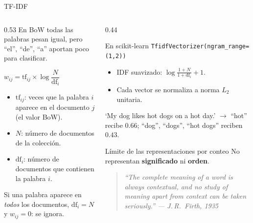 \documentclass[aspectratio=169, 10pt]{beamer}
\newcommand{\formula}[1]{%
	\begin{tcolorbox}[colback=UCMBlue!8, colframe=UCMBlue, arc=4pt,
		boxsep=2pt, left=6pt, right=6pt, top=3pt, bottom=3pt]
		#1
	\end{tcolorbox}
}
\begin{document}
\begin{frame}{TF-IDF}

	\begin{columns}[T]
		\begin{column}{0.53\textwidth}
			En BoW todas las palabras pesan igual, pero ``el'', ``de'', ``a'' aportan poco para clasificar.

			\formula{\centering $w_{ij} = \mathrm{tf}_{ij} \times \log\dfrac{N}{\mathrm{df}_i}$}

			\small
			\begin{itemize}
				\item $\mathrm{tf}_{ij}$: veces que la palabra $i$ aparece en el documento $j$ (el valor BoW).
				\item $N$: n\'umero de documentos de la colecci\'on.
				\item $\mathrm{df}_i$: n\'umero de documentos que contienen la palabra $i$.
			\end{itemize}

			Si una palabra aparece en \emph{todos} los documentos, $\mathrm{df}_i = N$ y $w_{ij} = 0$: se ignora.
		\end{column}

		\begin{column}{0.44\textwidth}
			\begin{block}{En scikit-learn}
				\scriptsize
				\texttt{TfidfVectorizer(ngram\_range=(1,2))}
				\begin{itemize}
					\item IDF suavizado: $\log\frac{1+N}{1+\mathrm{df}_i} + 1$.
					\item Cada vector se normaliza a norma $L_2$ unitaria.
				\end{itemize}
				`My dog likes hot dogs on a hot day.' $\to$ ``hot'' recibe $0.66$; ``dog'', ``dogs'', ``hot dogs'' reciben $0.43$.
			\end{block}

			\begin{alertblock}{L\'imite de las representaciones por conteo}
				\small
				No representan \textbf{significado} ni \textbf{orden}.
				\begin{quote}
					\scriptsize\itshape ``The complete meaning of a word is always contextual, and no study of meaning apart from context can be taken seriously.'' --- J.\,R.\ Firth, 1935
				\end{quote}
			\end{alertblock}
		\end{column}
	\end{columns}

\end{frame}
\end{document}
